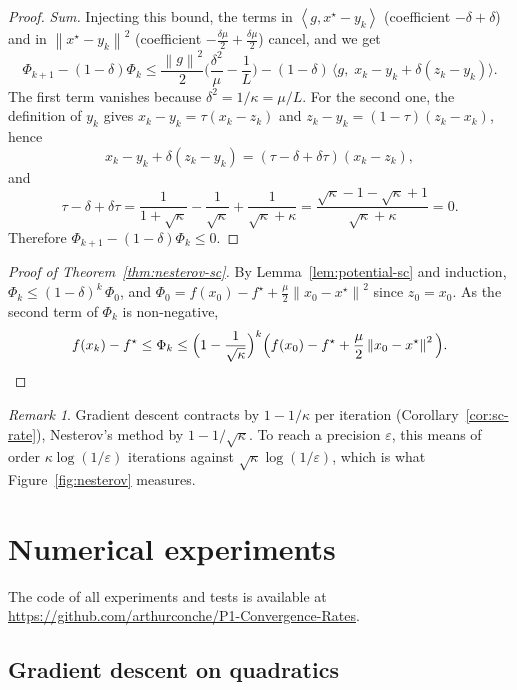 \documentclass[11pt,a4paper]{article}
\theoremstyle{definition}
\theoremstyle{remark}
\newtheorem{remark}{Remark}
\newcommand{\norm}[1]{\left\lVert #1 \right\rVert}
\newcommand{\ip}[2]{\left\langle #1, #2 \right\rangle}
\begin{document}
\begin{proof}
\emph{Sum.} Injecting this bound, the terms in $\ip{g}{x^\star - y_k}$ (coefficient $-\delta + \delta$) and in $\norm{x^\star - y_k}^2$ (coefficient $-\frac{\delta\mu}{2} + \frac{\delta\mu}{2}$) cancel, and we get
\[
\Phi_{k+1} - (1-\delta)\Phi_k \le \frac{\norm{g}^2}{2}\Big(\frac{\delta^2}{\mu} - \frac1L\Big) - (1-\delta)\,\Big\langle g,\; x_k - y_k + \delta(z_k - y_k)\Big\rangle .
\]
The first term vanishes because $\delta^2 = 1/\kappa = \mu/L$. For the second one, the definition of $y_k$ gives $x_k - y_k = \tau(x_k - z_k)$ and $z_k - y_k = (1-\tau)(z_k - x_k)$, hence
\[
x_k - y_k + \delta(z_k - y_k) = (\tau - \delta + \delta\tau)(x_k - z_k),
\]
and
\[
\tau - \delta + \delta\tau = \frac{1}{1+\sqrt\kappa} - \frac{1}{\sqrt\kappa} + \frac{1}{\sqrt\kappa + \kappa} = \frac{\sqrt\kappa - 1 - \sqrt\kappa + 1}{\sqrt\kappa + \kappa} = 0 .
\]
Therefore $\Phi_{k+1} - (1-\delta)\Phi_k \le 0$.
\end{proof}

\begin{proof}[Proof of Theorem~\ref{thm:nesterov-sc}]
By Lemma~\ref{lem:potential-sc} and induction, $\Phi_k \le (1-\delta)^k\,\Phi_0$, and $\Phi_0 = f(x_0) - f^\star + \frac\mu2\norm{x_0 - x^\star}^2$ since $z_0 = x_0$. As the second term of $\Phi_k$ is non-negative,
\[
f(x_k) - f^\star \le \Phi_k \le \Big(1 - \frac{1}{\sqrt\kappa}\Big)^k \Big( f(x_0) - f^\star + \frac\mu2 \norm{x_0 - x^\star}^2 \Big). \qedhere
\]
\end{proof}

\begin{remark}
Gradient descent contracts by $1 - 1/\kappa$ per iteration (Corollary~\ref{cor:sc-rate}), Nesterov's method by $1 - 1/\sqrt\kappa$. To reach a precision $\varepsilon$, this means of order $\kappa\log(1/\varepsilon)$ iterations against $\sqrt\kappa\log(1/\varepsilon)$, which is what Figure~\ref{fig:nesterov} measures.
\end{remark}

\section{Numerical experiments}\label{sec:experiments}
The code of all experiments and tests is available at \url{https://github.com/arthurconche/P1-Convergence-Rates}.


\subsection{Gradient descent on quadratics}\label{sec:exp-quadratic}
\end{document}

